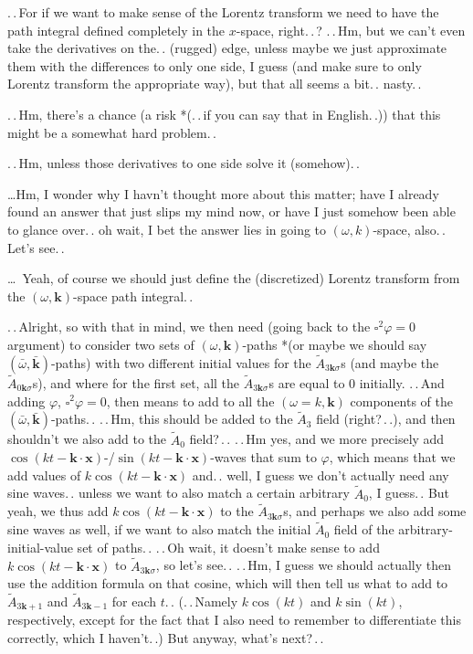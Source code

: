 \documentclass{report}
\begin{document}
.\,.\,For if we want to make sense of the Lorentz transform we need to have the path integral defined completely in the $x$-space, right.\,.\,? .\,.\,Hm, but we can't even take the derivatives on the.\,. (rugged) edge, unless maybe we just approximate them with the differences to only one side, I guess (and make sure to only Lorentz transform the appropriate way), but that all seems a bit.\,. nasty.\,. 

.\,.\,Hm, there's a chance (a risk *(.\,.\,if you can say that in English.\,.)) that this might be a somewhat hard problem.\,. 

.\,.\,Hm, unless those derivatives to one side solve it (somehow).\,. %

\ldots Hm, I wonder why I havn't thought more about this matter; have I already found an answer that just slips my mind now, or have I just somehow been able to glance over.\,. oh wait, I bet the answer lies in going to $(\omega, k)$-space, also.\,. Let's see.\,. %

\ldots\ Yeah, of course we should just define the (discretized) Lorentz transform from the $(\omega, \boldsymbol k)$-space path integral.\,. 

.\,.\,Alright, so with that in mind, we then need (going back to the $\square^2\varphi=0$ argument) to consider two sets of $(\omega, \boldsymbol{k})$-paths *(or maybe we should say $(\bar \omega, \bar{\boldsymbol{k}})$-paths) with two different initial values for the $\tilde A_{3\boldsymbol{k}\sigma}$s (and maybe the $\tilde A_{0\boldsymbol{k}\sigma}$s), and where for the first set, all the $\tilde A_{3\boldsymbol{k}\sigma}$s are equal to 0 initially. .\,.\,And adding $\varphi$, $\square^2\varphi=0$, then means to add to all the $(\omega=k, \boldsymbol{k})$ components of the $(\bar \omega, \bar{\boldsymbol{k}})$-paths.\,. .\,.\,Hm, this should be added to the $\tilde A_3$ field (right?\,.\,.), and then shouldn't we also add to the $\tilde A_0$ field?\,.\,. .\,.\,Hm yes, and we more precisely add $\cos(k t - \boldsymbol{k}\cdot\boldsymbol{x})$-/$\sin(k t - \boldsymbol{k}\cdot\boldsymbol{x})$-waves that sum to $\varphi$, which means that we add values of $k \cos(k t - \boldsymbol{k}\cdot\boldsymbol{x})$ and.\,. well, I guess we don't actually need any sine waves.\,. unless we want to also match a certain arbitrary $\tilde A_0$, I guess.\,. But yeah, we thus add $k \cos(k t - \boldsymbol{k}\cdot\boldsymbol{x})$ to the $\tilde A_{3\boldsymbol{k}\sigma}$s, and perhaps we also add some sine waves as well, if we want to also match the initial $\tilde A_0$ field of the arbitrary-initial-value set of paths.\,. .\,.\,Oh wait, it doesn't make sense to add $k \cos(k t - \boldsymbol{k}\cdot\boldsymbol{x})$ to $\tilde A_{3\boldsymbol{k}\sigma}$, so let's see.\,. .\,.\,Hm, I guess we should actually then use the addition formula on that cosine, which will then tell us what to add to $\tilde A_{3\boldsymbol{k}+1}$ and $\tilde A_{3\boldsymbol{k}-1}$ for each $t$.\,. %
(.\,.\,Namely $k\cos(kt)$ and $k\sin(kt)$, respectively, except for the fact that I also need to remember to differentiate this correctly, which I haven't.\,.) But anyway, what's next?\,.\,.
\end{document}
